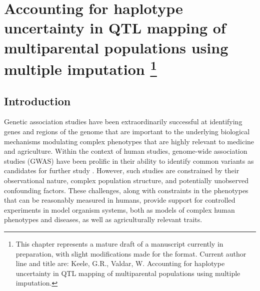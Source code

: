 \chapter[Accounting for haplotype uncertainty in QTL mapping of multiparental populations using multiple imputation]{Accounting for haplotype uncertainty in QTL mapping of multiparental populations using multiple imputation
\footnote{This chapter represents a mature draft of a manuscript currently in preparation, with slight modifications made for the format. Current author line and title are: Keele, G.R., Valdar, W. Accounting for haplotype uncertainty in QTL mapping of multiparental populations using multiple imputation.}}
\label{chap:mi}

\section{Introduction}

Genetic association studies have been extraordinarily successful at identifying genes and regions of the genome that are important to the underlying biological mechanisms modulating complex phenotypes that are highly relevant to medicine and agriculture. Within the context of human studies, genome-wide association studies (GWAS) have been prolific in their ability to identify common variants as candidates for further study \citep{Lee2016}. However, such studies are constrained by their observational nature, complex population structure, and potentially unobserved confounding factors. These challenges, along with constraints in the phenotypes that can be reasonably measured in humans, provide support for controlled experiments in model organism systems, both as models of complex human phenotypes and diseases, as well as agriculturally relevant traits.

